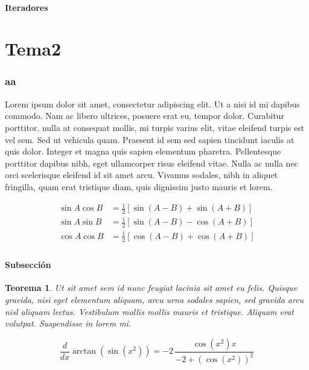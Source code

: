 \documentclass[10pt, a4paper]{article}
\theoremstyle{theorem-style}
\newtheorem{nth}{Teorema}[section]
\theoremstyle{definition-style}
\theoremstyle{remark-style}
\theoremstyle{example-style}
\theoremstyle{definition-style}
\theoremstyle{remark-style}
\begin{document}
\subsection{Iteradores}


\part{Tema2}


\section{aa}

Lorem ipsum dolor sit amet, consectetur adipiscing elit. Ut a nisi id mi dapibus commodo. Nam ac libero ultrices, posuere erat eu, tempor dolor. Curabitur porttitor, nulla at consequat mollis, mi turpis varius elit, vitae eleifend turpis est vel sem. Sed ut vehicula quam. Praesent id sem sed sapien tincidunt iaculis at quis dolor. Integer et magna quis sapien elementum pharetra. Pellentesque porttitor dapibus nibh, eget ullamcorper risus eleifend vitae. Nulla ac nulla nec orci scelerisque eleifend id sit amet arcu. Vivamus sodales, nibh in aliquet fringilla, quam erat tristique diam, quis dignissim justo mauris et lorem.

\begin{align*}
          \sin A \cos B &= \frac{1}{2}\left[ \sin(A-B)+\sin(A+B) \right] \\
          \sin A \sin B &= \frac{1}{2}\left[ \sin(A-B)-\cos(A+B) \right] \\
          \cos A \cos B &= \frac{1}{2}\left[ \cos(A-B)+\cos(A+B) \right] \\
\end{align*}

\subsection{Subsección}

\begin{nth}
  Ut sit amet sem id nunc feugiat lacinia sit amet eu felis. Quisque gravida, nisi eget elementum aliquam, arcu urna sodales sapien, sed gravida arcu nisl aliquam lectus. Vestibulum mollis mollis mauris et tristique. Aliquam erat volutpat. Suspendisse in lorem mi.

  $${\frac {d}{dx}}\arctan(\sin({x}^{2}))=-2\,{\frac {\cos({x}^{2})x}{-2+ \left (\cos({x}^{2})\right )^{2}}}$$
\end{nth}
\end{document}
